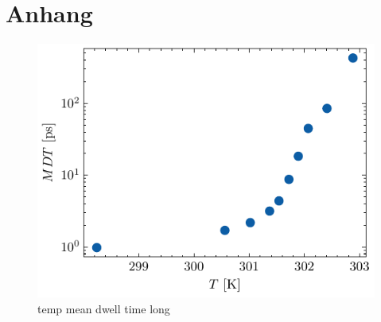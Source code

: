 \documentclass[main.tex]{subfiles}
\begin{document}
\newpage
\section{Anhang}

\begin{figure}[H]
    \centering
    \includegraphics{bilder/plots/temp_comparison_long/mean_dwell_time.pdf}
    \caption{temp mean dwell time long }\label{fig:temp-mdt-long}
\end{figure}
\end{document}
